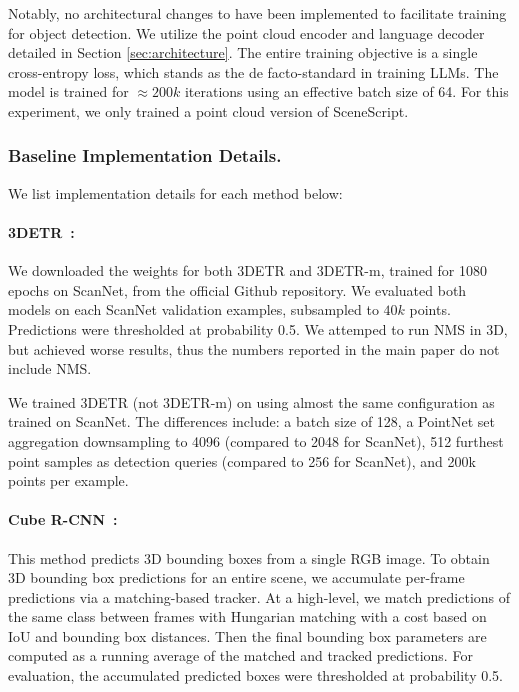 Notably, no architectural changes to \METHOD{} have been implemented to facilitate training for object detection. We utilize the point cloud encoder and language decoder detailed in Section \ref{sec:architecture}. The entire training objective is a single cross-entropy loss, which stands as the de facto-standard in training LLMs. The model is trained for $\approx 200k$ iterations using an effective batch size of 64. For this experiment, we only trained a point cloud version of SceneScript.



\subsubsection{Baseline Implementation Details.}

We list implementation details for each method below:
 

\paragraph{3DETR~\cite{misra2021end}:} We downloaded the weights for both 3DETR and 3DETR-m, trained for 1080 epochs on ScanNet, from the official Github repository. We evaluated both models on each ScanNet validation examples, subsampled to $40k$ points. Predictions were thresholded at probability 0.5. We attemped to run NMS in 3D, but achieved worse results, thus the numbers reported in the main paper do not include NMS.

We trained 3DETR (not 3DETR-m) on \DatasetName{} using almost the same configuration as trained on ScanNet. The differences include: a batch size of 128, a PointNet set aggregation downsampling to 4096 (compared to 2048 for ScanNet), 512 furthest point samples as detection queries (compared to 256 for ScanNet), and 200k points per example. 
    
\paragraph{Cube R-CNN~\cite{brazil2023omni3d}:} This method predicts 3D bounding boxes from a single RGB image. To obtain 3D bounding box predictions for an entire scene, we accumulate per-frame predictions via a matching-based tracker. At a high-level, we match predictions of the same class between frames with Hungarian matching with a cost based on IoU and bounding box distances. Then the final bounding box parameters are computed as a running average of the matched and tracked predictions. For evaluation, the accumulated predicted boxes were thresholded at probability 0.5.

